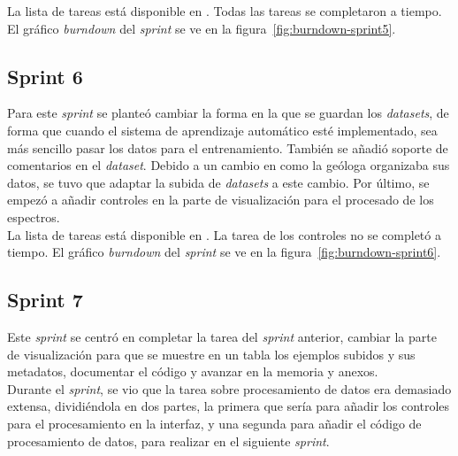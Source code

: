 La lista de tareas está disponible en
. Todas las tareas se completaron a tiempo. El gráfico \textit{burndown} del 
\textit{sprint} se ve en la figura~\ref{fig:burndown-sprint5}.\\


\subsection{Sprint 6}
Para este \textit{sprint} se planteó cambiar la forma en la que se guardan los
\textit{datasets}, de forma que cuando el sistema de aprendizaje automático esté
implementado, sea más sencillo pasar los datos para el entrenamiento. También se
añadió soporte de comentarios en el \textit{dataset}. Debido a un cambio en como
la geóloga organizaba sus datos, se tuvo que adaptar la subida de
\textit{datasets} a este cambio. Por último, se empezó a añadir controles en la
parte de visualización para el procesado de los espectros.\\

La lista de tareas está disponible en
. La tarea de los controles no se completó a tiempo. El gráfico 
\textit{burndown} del \textit{sprint} se ve en la 
figura~\ref{fig:burndown-sprint6}.\\


\subsection{Sprint 7}
Este \textit{sprint} se centró en completar la tarea del \textit{sprint}
anterior, cambiar la parte de visualización para que se muestre en un tabla los
ejemplos subidos y sus metadatos, documentar el código y avanzar en la memoria y
anexos.\\

Durante el \textit{sprint}, se vio que la tarea sobre procesamiento de datos era
demasiado extensa, dividiéndola en dos partes, la primera que sería para añadir 
los controles para el procesamiento en la interfaz, y una segunda para añadir el
código de procesamiento de datos, para realizar en el siguiente
\textit{sprint}.\\

